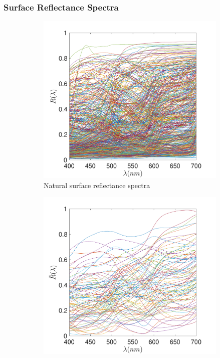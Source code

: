 \documentclass{jov}
\begin{document}
\subsubsection{Surface Reflectance Spectra}
\begin{figure}
\centering
	\begin{subfigure}[b]{0.3 \textwidth}
    \centering
        \includegraphics[width=\textwidth]{../Figures/Figure7/Figure7_a.pdf}
        \caption{Natural surface reflectance spectra}
        \label{fig:naturalSurface}
    \end{subfigure}
    \begin{subfigure}[b]{0.3\textwidth}
    \centering
        \includegraphics[width=\textwidth]{../Figures/Figure7/Figure7_b.pdf}

\end{subfigure}
\end{figure}
\end{document}
